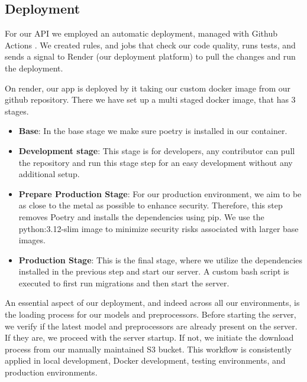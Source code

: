 \subsection{Deployment}
For our API we employed an automatic deployment, managed with Github Actions \cite{github_actions}. We created rules, and jobs that check our code quality, runs tests, and sends a signal to Render \cite{render} (our deployment platform) to pull the changes and run the deployment.

On render, our app is deployed by it taking our custom docker image from our github repository. There we have set up a multi staged docker image, that has 3 stages.

\begin{itemize}
    \item \textbf{Base}: In the base stage we make sure poetry is installed in our container.
    \item \textbf{Development stage}: This stage is for developers, any contributor can pull the repository and run this stage step for an easy development without any additional setup.
    \item \textbf{Prepare Production Stage}: For our production environment, we aim to be as close to the metal as possible to enhance security. Therefore, this step removes Poetry and installs the dependencies using pip. We use the python:3.12-slim image to minimize security risks associated with larger base images.
    \item \textbf{Production Stage}: This is the final stage, where we utilize the dependencies installed in the previous step and start our server. A custom bash script is executed to first run migrations and then start the server.
\end{itemize}

An essential aspect of our deployment, and indeed across all our environments, is the loading process for our models and preprocessors. Before starting the server, we verify if the latest model and preprocessors are already present on the server. If they are, we proceed with the server startup. If not, we initiate the download process from our manually maintained S3 bucket. This workflow is consistently applied in local development, Docker \cite{docker} development, testing environments, and production environments.


